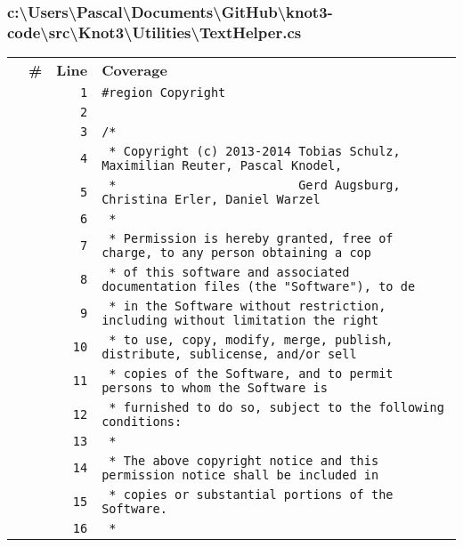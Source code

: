 \documentclass[a4paper,10pt]{article}
\begin{document}
\subsubsection{c:\textbackslash Users\textbackslash Pascal\textbackslash Documents\textbackslash GitHub\textbackslash knot3-code\textbackslash src\textbackslash Knot3\textbackslash Utilities\textbackslash TextHelper.cs}
\begin{longtable}[l]{lrrl}
\textbf{} & \textbf{\#} & \textbf{Line} & \textbf{Coverage}\\
\cellcolor{gray} &  & \verb~1~ & \verb~#region Copyright~\\
\cellcolor{gray} &  & \verb~2~ & \verb~~\\
\cellcolor{gray} &  & \verb~3~ & \verb~/*~\\
\cellcolor{gray} &  & \verb~4~ & \verb~ * Copyright (c) 2013-2014 Tobias Schulz, Maximilian Reuter, Pascal Knodel,~\\
\cellcolor{gray} &  & \verb~5~ & \verb~ *                         Gerd Augsburg, Christina Erler, Daniel Warzel~\\
\cellcolor{gray} &  & \verb~6~ & \verb~ *~\\
\cellcolor{gray} &  & \verb~7~ & \verb~ * Permission is hereby granted, free of charge, to any person obtaining a cop~\\
\cellcolor{gray} &  & \verb~8~ & \verb~ * of this software and associated documentation files (the "Software"), to de~\\
\cellcolor{gray} &  & \verb~9~ & \verb~ * in the Software without restriction, including without limitation the right~\\
\cellcolor{gray} &  & \verb~10~ & \verb~ * to use, copy, modify, merge, publish, distribute, sublicense, and/or sell~\\
\cellcolor{gray} &  & \verb~11~ & \verb~ * copies of the Software, and to permit persons to whom the Software is~\\
\cellcolor{gray} &  & \verb~12~ & \verb~ * furnished to do so, subject to the following conditions:~\\
\cellcolor{gray} &  & \verb~13~ & \verb~ *~\\
\cellcolor{gray} &  & \verb~14~ & \verb~ * The above copyright notice and this permission notice shall be included in ~\\
\cellcolor{gray} &  & \verb~15~ & \verb~ * copies or substantial portions of the Software.~\\
\cellcolor{gray} &  & \verb~16~ & \verb~ *~\\

\end{longtable}
\end{document}
